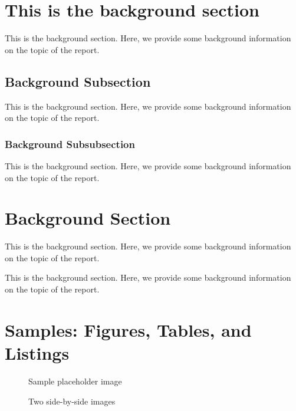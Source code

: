 \documentclass{report}
\begin{document}
\section{This is the background section}
This is the background section. Here, we provide some background information on
the topic of the report.

\subsection{Background Subsection}
This is the background section. Here, we provide some background information on
the topic of the report.
\subsubsection{Background Subsubsection}
This is the background section. Here, we provide some background information on the topic of the report.

\section{Background Section}
This is the background section. Here, we provide some background information on the topic of the report.

This is the background section. Here, we provide some background information on the topic of the report.

\section{Samples: Figures, Tables, and Listings}

\begin{figure}[htbp]
  \centering
  \caption{Sample placeholder image}\label{fig:img-placeholder}
\end{figure}
\begin{figure}[htbp]

  \centering
  \begin{minipage}{0.46\linewidth}
    \centering
  \end{minipage}
  \hfill
  \begin{minipage}{0.46\linewidth}
    \centering
  \end{minipage}
  \caption{Two side-by-side images}\label{fig:two-images}
\end{figure}
\end{document}
